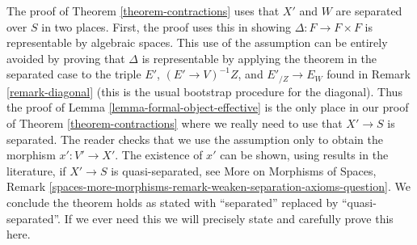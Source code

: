\begin{remark}
\label{remark-separated-needed}
The proof of Theorem \ref{theorem-contractions} uses that $X'$ and $W$
are separated over $S$ in two places. First, the proof uses this in showing
$\Delta : F \to F \times F$ is representable by algebraic spaces.
This use of the assumption can be entirely avoided by proving
that $\Delta$ is representable by applying the theorem in the
separated case to the triple
$E'$, $(E' \to V)^{-1}Z$, and $E'_{/Z} \to E_W$
found in Remark \ref{remark-diagonal} (this is the usual bootstrap
procedure for the diagonal). Thus the proof of
Lemma \ref{lemma-formal-object-effective} is the only
place in our proof of Theorem \ref{theorem-contractions}
where we really need to use that $X' \to S$ is separated.
The reader checks that we use the assumption only to obtain
the morphism $x' : V' \to X'$. The existence of $x'$ can be shown,
using results in the literature, if $X' \to S$ is quasi-separated, see
More on Morphisms of Spaces, Remark
\ref{spaces-more-morphisms-remark-weaken-separation-axioms-question}.
We conclude the theorem holds as stated with
``separated'' replaced by ``quasi-separated''. If we ever need this
we will precisely state and carefully prove this here.
\end{remark}





















